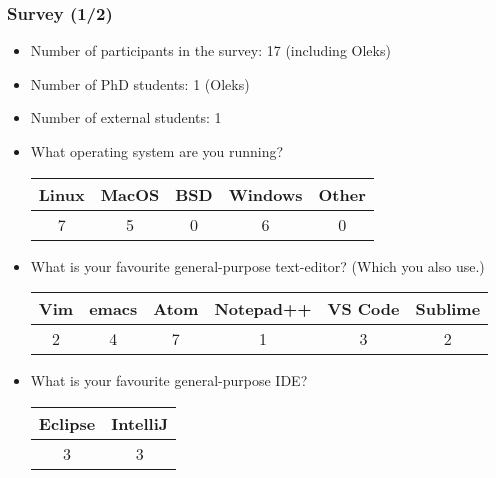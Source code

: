 \def\arraystretch{1.2}

\begin{frame}

\frametitle{Survey (1/2)}

\begin{itemize}

\footnotesize

\item Number of participants in the survey: 17 (including Oleks)

\item Number of PhD students: 1 (Oleks)

\item Number of external students: 1

\item What operating system are you running?

\begin{tabular}{|c|c|c|c|c|}
\hline
\textbf{Linux} & \textbf{MacOS} & \textbf{BSD} &%
\textbf{Windows} & \textbf{Other}
\\\hline
7 & 5 & 0 & 6 & 0
\\\hline
\end{tabular}

\item What is your favourite general-purpose text-editor? (Which you also use.)

\begin{tabular}{|c|c|c|c|c|c|}
\hline
\textbf{Vim} & \textbf{emacs} & \textbf{Atom} &%
\textbf{Notepad++} & \textbf{VS Code} & \textbf{Sublime}
\\\hline
2 & 4 & 7 & 1 & 3 & 2
\\\hline
\end{tabular}

\item What is your favourite general-purpose IDE?

\begin{tabular}{|c|c|}
\hline
\textbf{Eclipse} & \textbf{IntelliJ}
\\\hline
3 & 3
\\\hline
\end{tabular}

\end{itemize}

\end{frame}

